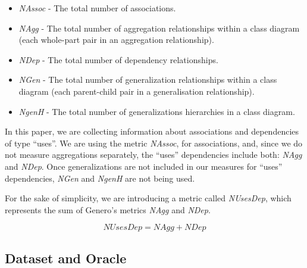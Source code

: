 \documentclass[review]{elsarticle}
\newcommand{\aspas}[1]{{``#1''}}
\begin{document}
\begin{itemize}
	\item \textit{NAssoc} - The total number of associations.
	\item \textit{NAgg} - The total number of aggregation relationships within a class
diagram (each whole-part pair in an aggregation relationship).
	\item \textit{NDep} - The total number of dependency relationships.
	\item \textit{NGen} - The total number of generalization relationships
within a class diagram (each parent-child pair in a
generalisation relationship).
	\item \textit{NgenH} - The total number of generalizations hierarchies in a class
diagram.
\end{itemize} 

In this paper, we are collecting information about associations and dependencies of type \aspas{uses}. We are using the metric \textit{NAssoc}, for associations, and, since we do not measure aggregations separately, the \aspas{uses} dependencies include both: \textit{NAgg} and \textit{NDep}. Once generalizations are not included in our measures for \aspas{uses} dependencies, \textit{NGen} and \textit{NgenH} are not being used.  

For the sake of simplicity, we are introducing a metric called \textit{NUsesDep}, which represents the sum of Genero's metrics \textit{NAgg} and \textit{NDep}.

\vspace{2.5 mm}

\[
\textit{NUsesDep} = \textit{NAgg} + \textit{NDep}
\]

\vspace{3.0 mm}


\subsection{Dataset and Oracle}
\label{subsec:dataset-oracle}
\end{document}
